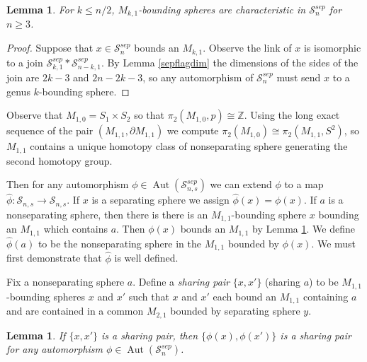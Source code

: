 \documentclass[11pt]{article}
\newcommand{\Z}{\mathbb{Z}}
\DeclareMathOperator{\aaut}{Aut}
\newtheorem{lemma}[theorem]{Lemma}
\theoremstyle{remark}
\theoremstyle{definition}
\begin{document}
\begin{lemma}
  \label{sepgenpreserved}
For $k\leq n/2$,
$M_{k,1}$-bounding spheres are characteristic in $\mathcal {S}^{sep}_{n}$ for $n\geq 3$.
\end{lemma}
\begin{proof}
Suppose that $x \in \mathcal {S}^{sep}_{n}$ bounds
an $M_{k,1}$.
Observe the link of $x$ is isomorphic to
a join
$\mathcal S^{sep}_{k,1}  \ast \mathcal S^{sep}_{n-k,1}$.
By Lemma \ref{sepflagdim}
the dimensions of the sides of the join are $2k-3$ and $2n-2k-3$,
so any automorphism of $\mathcal {S}^{sep}_{n}$
must send $x$ to a genus $k$-bounding sphere.
\end{proof}


Observe that
$M_{1,0} = S_1 \times S_2$
so that $\pi_2(M_{1,0},p) \cong \Z$.
Using the long exact sequence of the pair
$(M_{1,1},\partial M_{1,1})$
we compute  $\pi_2(M_{1,0}) \cong \pi_2 (M_{1,1}, S^2 )$,
so $M_{1,1}$
contains a unique homotopy class of nonseparating sphere
generating the second homotopy group.

Then for any automorphism $\phi \in \aaut \left (  \mathcal S^{sep}_{n,s}\right)$
we can extend $\phi$ to a map
$\hat \phi : \mathcal S_{n,s} \to \mathcal S_{n,s}$.
If $x$ is a separating sphere we assign $\hat \phi (x) = \phi(x)$.
If $a$ is a nonseparating sphere, then
there is there is an $M_{1,1}$-bounding sphere $x$
bounding an $M_{1,1}$ which contains $a$.
Then $\phi(x)$ bounds an $M_{1,1}$ by
Lemma \ref{sepgenpreserved}.
We define $\hat \phi(a)$ to be
the nonseparating sphere in the $M_{1,1}$ bounded by $\phi(x)$.
We must first demonstrate that $\hat \phi$ is well defined.

Fix a nonseparating sphere $a$.
Define a \emph{sharing pair} $\{x,x'\}$ (sharing $a$) to be
$M_{1,1}$-bounding spheres $x$ and $x'$
such that $x$ and $x'$ each bound an $M_{1,1}$ containing $a$
and are contained in a common $M_{2,1}$ bounded by separating sphere $y$.

\begin{lemma}
  \label{sepsharepair}
If $\{x,x'\}$ is a sharing pair, then $\{\phi(x),\phi(x')\}$
is a sharing pair for any
automorphism $\phi \in \aaut\left( \mathcal S^{sep}_{n} \right )$.
\end{lemma}
\end{document}
